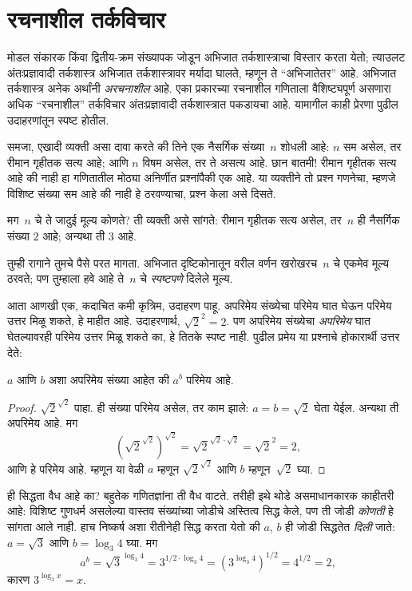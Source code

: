 \documentclass[../../../include/open-logic-chapter]{subfiles}
\begin{document}

\section{रचनाशील तर्कविचार}

मोडल संकारक किंवा द्वितीय-क्रम संख्यापक जोडून अभिजात
तर्कशास्त्राचा विस्तार करता येतो; त्याउलट
अंतःप्रज्ञावादी तर्कशास्त्र अभिजात तर्कशास्त्रावर
मर्यादा घालते, म्हणून ते ``अभिजातेतर'' आहे.
अभिजात तर्कशास्त्र अनेक अर्थांनी \emph{अरचनाशील}
आहे. एका प्रकारच्या रचनाशील गणिताला वैशिष्ट्यपूर्ण
असणारा अधिक ``रचनाशील'' तर्कविचार अंतःप्रज्ञावादी
तर्कशास्त्रात पकडायचा आहे. यामागील काही प्रेरणा
पुढील उदाहरणांतून स्पष्ट होतील.

समजा, एखादी व्यक्ती असा दावा करते की तिने एक नैसर्गिक
संख्या~$n$ शोधली आहे: $n$ सम असेल, तर रीमान
गृहीतक सत्य आहे; आणि $n$ विषम असेल, तर ते असत्य
आहे. छान बातमी!{} रीमान गृहीतक सत्य आहे की नाही
हा गणितातील मोठ्या अनिर्णीत प्रश्नांपैकी एक आहे.
या व्यक्तीने तो प्रश्न गणनेचा, म्हणजे विशिष्ट संख्या
सम आहे की नाही हे ठरवण्याचा, प्रश्न केला असे दिसते.

मग~$n$ चे ते जादुई मूल्य कोणते? ती व्यक्ती असे
सांगते: रीमान गृहीतक सत्य असेल, तर~$n$ ही नैसर्गिक
संख्या $2$ आहे; अन्यथा ती $3$ आहे.

तुम्ही रागाने तुमचे पैसे परत मागता. अभिजात दृष्टिकोनातून
वरील वर्णन खरोखरच~$n$ चे एकमेव मूल्य ठरवते;
पण तुम्हाला हवे आहे ते~$n$ चे \emph{स्पष्टपणे}
दिलेले मूल्य.

आता आणखी एक, कदाचित कमी कृत्रिम, उदाहरण पाहू.
अपरिमेय संख्येचा परिमेय घात घेऊन परिमेय उत्तर मिळू
शकते, हे माहीत आहे. उदाहरणार्थ, $\sqrt{2}^2 = 2$.
पण अपरिमेय संख्येचा \emph{अपरिमेय} घात घेतल्यावरही
परिमेय उत्तर मिळू शकते का, हे तितके स्पष्ट नाही.
पुढील प्रमेय या प्रश्नाचे होकारार्थी उत्तर देते:

\begin{thm}
$a$ आणि $b$ अशा अपरिमेय संख्या आहेत की $a^b$ परिमेय आहे.
\end{thm}

\begin{proof}
$\sqrt{2}^{\sqrt{2}}$ पाहा. ही संख्या परिमेय असेल,
तर काम झाले: $a = b = \sqrt{2}$ घेता येईल. अन्यथा
ती अपरिमेय आहे. मग
\[
(\sqrt{2}^{\sqrt{2}})^{\sqrt{2}} = \sqrt{2}^{\sqrt{2} \cdot
  \sqrt{2}} = \sqrt{2}^2 = 2,
\]
आणि हे परिमेय आहे. म्हणून या वेळी $a$ म्हणून
$\sqrt{2}^{\sqrt{2}}$ आणि $b$ म्हणून~$\sqrt 2$ घ्या.
\end{proof}

ही सिद्धता वैध आहे का? बहुतेक गणितज्ञांना ती वैध
वाटते. तरीही इथे थोडे असमाधानकारक काहीतरी आहे:
विशिष्ट गुणधर्म असलेल्या वास्तव संख्यांच्या जोडीचे
अस्तित्व सिद्ध केले, पण ती जोडी \emph{कोणती} हे
सांगता आले नाही. हाच निष्कर्ष अशा रीतीनेही सिद्ध
करता येतो की $a$, $b$ ही जोडी सिद्धतेत \emph{दिली}
जाते: $a = \sqrt{3}$ आणि $b = \log_3 4$ घ्या. मग
\[
a^b = \sqrt{3}^{\log_3 4} = 3^{1/2 \cdot \log_3 4} = (3^{\log_3
  4})^{1/2} = 4^{1/2}= 2,
\]
कारण $3^{\log_3 x} = x$.
\end{document}
